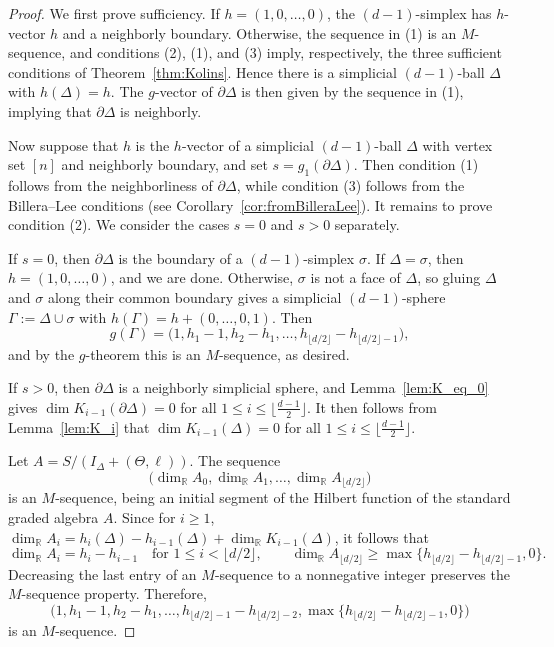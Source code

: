 \documentclass[11pt]{article}
\theoremstyle{definition}
\numberwithin{equation}{theorem}
\newcommand{\kk}{{\mathbb R}}
\begin{document}
\begin{proof}
We first prove sufficiency. If $h=(1,0,\ldots,0)$, the $(d-1)$-simplex has $h$-vector $h$ and a neighborly boundary. Otherwise, the sequence in (1) is an $M$-sequence, and conditions (2), (1), and (3) imply, respectively, the three sufficient conditions of Theorem~\ref{thm:Kolins}. Hence there is a simplicial $(d-1)$-ball $\Delta$ with $h(\Delta)=h$. The $g$-vector of $\partial \Delta$ is then given by the sequence in (1), implying that $\partial \Delta$ is neighborly.


Now suppose that $h$ is the $h$-vector of a simplicial $(d-1)$-ball $\Delta$ with vertex set $[n]$ and neighborly boundary, and set $s=g_1(\partial\Delta)$. Then condition (1) follows from the neighborliness of $\partial\Delta$, while condition (3) follows from the Billera--Lee conditions (see Corollary~\ref{cor:fromBilleraLee}). It remains to prove condition (2). We consider the cases $s=0$ and $s>0$ separately.

If $s=0$, then $\partial\Delta$ is the boundary of a $(d-1)$-simplex $\sigma$. If $\Delta=\sigma$, then $h=(1,0,\ldots,0)$, and we are done. Otherwise, $\sigma$ is not a face of $\Delta$, so gluing $\Delta$ and $\sigma$ along their common boundary gives a simplicial $(d-1)$-sphere $\Gamma:=\Delta\cup\sigma$ with $h(\Gamma)=h+(0,\ldots,0,1)$. Then 
\[g(\Gamma)=\bigl(1,h_1-1,h_2-h_1,\ldots,h_{\lfloor d/2\rfloor}-h_{\lfloor d/2\rfloor-1}\bigr),\]
and by the $g$-theorem this is an $M$-sequence, as desired.


If $s>0$, then $\partial\Delta$ is a neighborly simplicial sphere, and Lemma~\ref{lem:K_eq_0} gives $\dim K_{i-1}(\partial \Delta)=0$ for all $1 \leq i \leq \lfloor\frac{d-1}{2}\rfloor$. It then follows from Lemma~\ref{lem:K_i} that $\dim K_{i-1}(\Delta)=0$ for all $1\leq i \leq \lfloor\frac{d-1}{2}\rfloor$. 

Let $A=S/(I_{\Delta}+(\Theta,\ell))$. The sequence 
\[
\bigl(\dim_\kk A_0,\dim_\kk A_1,\ldots,\dim_\kk A_{\lfloor d/2\rfloor}\bigr)
\]
is an $M$-sequence, being an initial segment of the Hilbert function of the standard graded algebra $A$. Since for $i\geq 1$,
$\dim_\kk A_i=h_i(\Delta)-h_{i-1}(\Delta)+\dim_\kk K_{i-1}(\Delta)$, it follows that
\[
\dim_\kk A_i=h_i-h_{i-1}\quad\text{for }1\le i<\lfloor d/2\rfloor,
\qquad
\dim_\kk A_{\lfloor d/2\rfloor}\ge\max\{h_{\lfloor d/2\rfloor}-h_{\lfloor d/2\rfloor-1},0\}.
\]
Decreasing the last entry of an $M$-sequence to a nonnegative integer preserves the $M$-sequence property. Therefore,
\[
\bigl(1,h_1-1,h_2-h_1,\ldots,h_{\lfloor d/2\rfloor-1}-h_{\lfloor d/2\rfloor-2},\max\{h_{\lfloor d/2\rfloor}-h_{\lfloor d/2\rfloor-1},0\}\bigr)
\]
is an $M$-sequence.
\end{proof}
\end{document}
